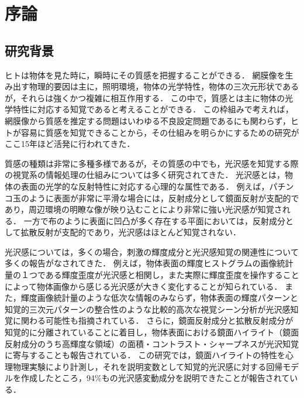 \chapter{序論}
    \section{研究背景}
        ヒトは物体を見た時に，瞬時にその質感を把握することができる．
        網膜像を生み出す物理的要因は主に，照明環境，物体の光学特性，物体の三次元形状であるが，それらは強くかつ複雑に相互作用する．
        この中で，質感とは主に物体の光学特性に対応する知覚であると考えることができる．
        この枠組みで考えれば，網膜像から質感を推定する問題はいわゆる不良設定問題であるにも関わらず，ヒトが容易に質感を知覚できることから，その仕組みを明らかにするための研究がここ15年ほど活発に行われてきた．

        質感の種類は非常に多種多様であるが\cite{Material}，その質感の中でも，光沢感を知覚する際の視覚系の情報処理の仕組みについては多く研究されてきた．
        光沢感とは，物体の表面の光学的な反射特性に対応する心理的な属性である．
        例えば，パチンコ玉のように表面が非常に平滑な場合には，反射成分として鏡面反射が支配的であり，周辺環境の明瞭な像が映り込むことにより非常に強い光沢感が知覚される．
        一方で布のように表面に凹凸が多く存在する平面においては，反射成分として拡散反射が支配的であり，光沢感はほとんど知覚されない．

        光沢感については，多くの場合，刺激の輝度成分と光沢感知覚の関連性について多くの報告がなされてきた．
        例えば，物体表面の輝度ヒストグラムの画像統計量の１つである輝度歪度が光沢感と相関し，また実際に輝度歪度を操作することによって物体画像から感じる光沢感が大きく変化することが知られている\cite{Motoyoshi}．
        また，輝度画像統計量のような低次な情報のみならず，物体表面の輝度パターンと知覚的三次元パターンの整合性のような比較的高次な視覚シーン分析が光沢感知覚に関わる可能性も指摘されている\cite{Marlow1}．
        さらに，鏡面反射成分と拡散反射成分が知覚的に分離されていることに着目し，物体表面における鏡面ハイライト（鏡面反射成分のうち高輝度な領域）の面積・コントラスト・シャープネスが光沢知覚に寄与することも報告されている\cite{Marlow2}．
        この研究では，鏡面ハイライトの特性を心理物理実験により計測し，それを説明変数として知覚的光沢感に対する回帰モデルを作成したところ，94\%もの光沢感変動成分を説明できたことが報告されている．

